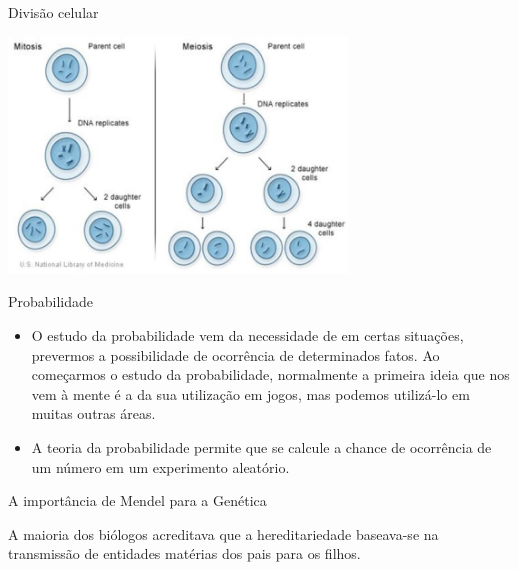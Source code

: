 \documentclass[]{beamer}
\begin{document}
  \begin{frame}{Divisão celular}
    \begin{center}
      \includegraphics[width=9cm]{images/divisao-celular.png}
    \end{center}
  \end{frame}

  \begin{frame}{Probabilidade}
    \begin{center}
      \begin{itemize}
        \item O estudo da probabilidade vem da necessidade de em certas
          situações, prevermos a possibilidade de ocorrência de determinados
          fatos. Ao começarmos o estudo da probabilidade, normalmente a primeira
          ideia que nos vem à mente é a da sua utilização em jogos, mas podemos
          utilizá-lo em muitas outras áreas. 
        \item A teoria da probabilidade permite que se calcule a chance de
          ocorrência de um número em um experimento aleatório.
      \end{itemize}
    \end{center}
  \end{frame}

  \begin{frame}{A importância de Mendel para a Genética}
    \begin{center}
      A maioria dos biólogos acreditava que a hereditariedade baseava-se na transmissão de entidades matérias dos pais para os filhos.
    \end{center}
  \end{frame}
\end{document}
